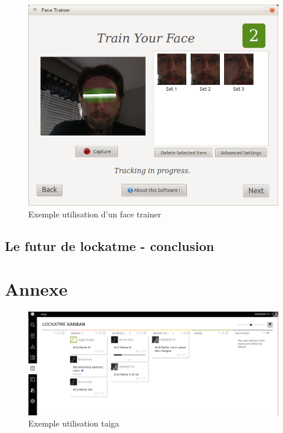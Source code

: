 \documentclass[french]{report}
\begin{document}
\begin{figure}[h]\label{fig:facetrain}
  \includegraphics[width=\linewidth]{facetrain}
  \caption{Exemple utilisation d'un face trainer}
  \label{fig:facetrain}
\end{figure}

\section{Le futur de lockatme - conclusion}



\chapter*{Annexe}

\begin{figure}[h]\label{fig:Taiga}
  \includegraphics[width=\linewidth]{taiga2}
  \caption{Exemple utilisation taiga}
  \label{fig:Taiga}
\end{figure}
\end{document}
